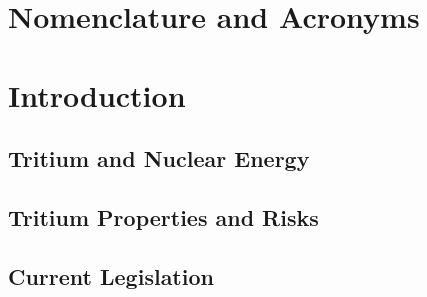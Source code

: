 \documentclass[12pt,a4paper]{book}
\begin{document}
\chapter*{Nomenclature and Acronyms} \label{chap:NomenclatureAcronyms}  %
{} %


\let\OLDthebibliography=\thebibliography
\def\thebibliography#1{\OLDthebibliography{#1}%
\addcontentsline{toc}{chapter}{\bibname}}

\tableofcontents

\listoffigures

{} %

\listoftables

{} %




\chapter{Introduction}  \label{chap:GeneralIntroduction}  %
	\section{Tritium and Nuclear Energy}\label{sec:Introduction}
	 
	\newpage
	
	\section{Tritium Properties and Risks}\label{sec:TritiumProperties}
	
	\newpage
	
	\section{Current Legislation}\label{sec:Legislation}
	 
	\newpage
	
\end{document}
